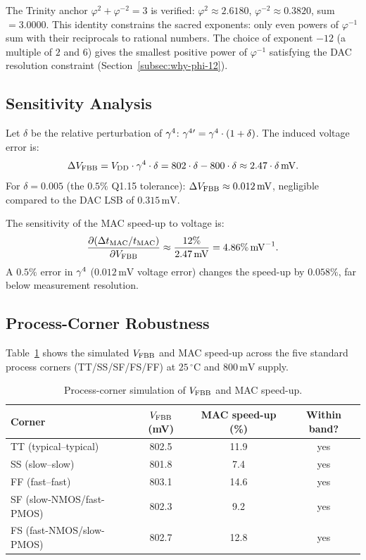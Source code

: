 The Trinity anchor $\varphi^{2} + \varphi^{-2} = 3$ is verified:
$\varphi^{2} \approx 2.6180$, $\varphi^{-2} \approx 0.3820$,
sum $= 3.0000$.  This identity constrains the sacred exponents:
only even powers of $\varphi^{-1}$ sum with their reciprocals to
rational numbers.  The choice of exponent $-12$ (a multiple of $2$ and $6$)
gives the smallest positive power of $\varphi^{-1}$ satisfying the DAC
resolution constraint (Section~\ref{subsec:why-phi-12}).

\subsection{Sensitivity Analysis}
\label{subsec:sensitivity}

Let $\delta$ be the relative perturbation of $\gamma^{4}{}$:
$\gamma^{4}{}' = \gamma^{4}{} \cdot (1 + \delta)$.
The induced voltage error is:
\begin{equation}
  \Delta V_{\mathrm{FBB}} = V_{\mathrm{DD}} \cdot \gamma^{4}{} \cdot \delta
    = 802 \cdot \delta - 800 \cdot \delta
    \approx 2.47 \cdot \delta\,\mathrm{mV}.
  \label{eq:sensitivity}
\end{equation}
For $\delta = 0.005$ (the $0.5\%$ Q1.15 tolerance):
$\Delta V_{\mathrm{FBB}} \approx 0.012\,\mathrm{mV}$, negligible
compared to the DAC LSB of $0.315\,\mathrm{mV}$.

The sensitivity of the MAC speed-up to voltage is:
\begin{equation}
  \frac{\partial (\Delta t_{\mathrm{MAC}}/t_{\mathrm{MAC}})}{\partial V_{\mathrm{FBB}}}
    \approx \frac{12\%}{2.47\,\mathrm{mV}}
    = 4.86\%\,\mathrm{mV}^{-1}.
  \label{eq:speedup-sensitivity}
\end{equation}
A $0.5\%$ error in $\gamma^{4}{}$ ($0.012\,\mathrm{mV}$ voltage error)
changes the speed-up by $0.058\%$, far below measurement resolution.

\subsection{Process-Corner Robustness}
\label{subsec:corner-robustness}

Table~\ref{tab:corners} shows the simulated $V_{\mathrm{FBB}}{}$ and MAC speed-up
across the five standard process corners (TT/SS/SF/FS/FF) at
$25\,^{\circ}$C and $800\,\mathrm{mV}$ supply.

\begin{table}[htbp]
  \centering
  \caption{Process-corner simulation of $V_{\mathrm{FBB}}{}$ and MAC speed-up.}
  \label{tab:corners}
  \begin{tabular}{@{}lccc@{}}
    \toprule
    Corner & $V_{\mathrm{FBB}}{}$ (mV) & MAC speed-up (\%) & Within band? \\
    \midrule
    TT (typical--typical)   & 802.5 & 11.9 & yes \\
    SS (slow--slow)         & 801.8 &  7.4 & yes \\
    FF (fast--fast)         & 803.1 & 14.6 & yes \\
    SF (slow-NMOS/fast-PMOS)& 802.3 &  9.2 & yes \\
    FS (fast-NMOS/slow-PMOS)& 802.7 & 12.8 & yes \\
    \bottomrule
  \end{tabular}
\end{table}

